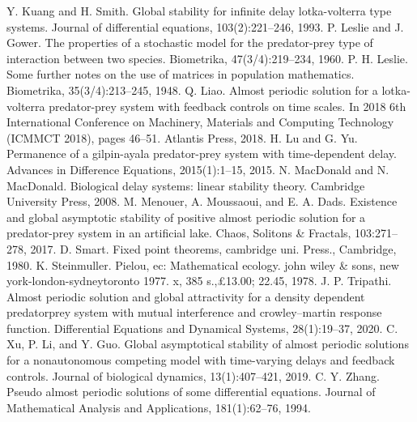 \documentclass[[a4paper,10pt]{article}
\begin{document}
\begin{thebibliography}{23}
Y. Kuang and H. Smith. Global stability for infinite delay lotka-volterra type systems. Journal of differential equations, 103(2):221–246, 1993.
 P. Leslie and J. Gower. The properties of a stochastic model for the predator-prey type of interaction between two species. Biometrika, 47(3/4):219–234, 1960.
 P. H. Leslie. Some further notes on the use of matrices in population mathematics. Biometrika, 35(3/4):213–245, 1948.
 Q. Liao. Almost periodic solution for a lotka-volterra predator-prey system with feedback controls on time scales. In 2018 6th International Conference on Machinery, Materials and Computing Technology (ICMMCT 2018), pages 46–51. Atlantis Press, 2018.
 H. Lu and G. Yu. Permanence of a gilpin-ayala predator-prey system with time-dependent delay. Advances in Difference Equations, 2015(1):1–15, 2015.
 N. MacDonald and N. MacDonald. Biological delay systems: linear stability theory. Cambridge University Press, 2008.
 M. Menouer, A. Moussaoui, and E. A. Dads. Existence and global asymptotic stability of positive almost periodic solution for a predator-prey system in an artificial lake. Chaos, Solitons \& Fractals, 103:271–278, 2017.
 D. Smart. Fixed point theorems, cambridge uni. Press., Cambridge, 1980.
 K. Steinmuller. Pielou, ec: Mathematical ecology. john wiley \& sons, new york-london-sydneytoronto 1977. x, 385 s.,£13.00; 22.45, 1978.
 J. P. Tripathi. Almost periodic solution and global attractivity for a density dependent predatorprey system with mutual interference and crowley–martin response function. Differential Equations and Dynamical Systems, 28(1):19–37, 2020.
 C. Xu, P. Li, and Y. Guo. Global asymptotical stability of almost periodic solutions for a nonautonomous competing model with time-varying delays and feedback controls. Journal of biological
dynamics, 13(1):407–421, 2019.
 C. Y. Zhang. Pseudo almost periodic solutions of some differential equations. Journal of Mathematical Analysis and Applications, 181(1):62–76, 1994.

\end{thebibliography}
\end{document}
